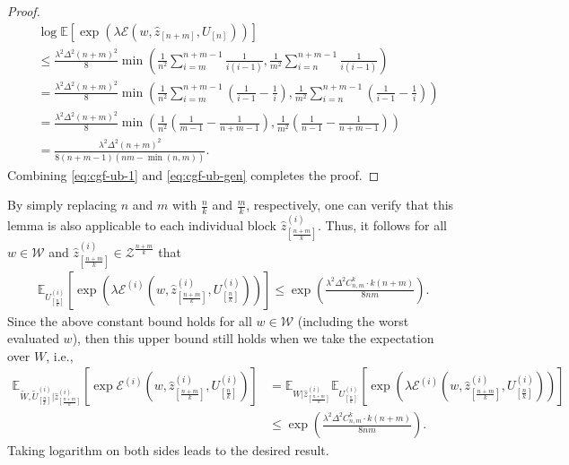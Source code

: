 \documentclass[onecolumn,romanappendices,10pt]{IEEEtran}
\newcommand{\Ecal}{{\mathcal E}}
\newcommand{\Wcal}{{\mathcal W}}
\newcommand{\Zcal}{{\mathcal Z}}
\newcommand{\EE}{{\mathbb{E}}}
\begin{document}
\begin{proof}
\begin{equation}
			\begin{aligned}
				&\log \EE \left[ \exp \left( \lambda \Ecal\left( w, \hat{z}_{[n+m]}, U_{[n]} \right) \right) \right] \\
				&\leq \frac{\lambda^2 \Delta^2 (n+m)^2}{8} \min \left( \frac{1}{n^2} \sum_{i=m}^{n+m-1} \frac{1}{i(i-1)}, \frac{1}{m^2} \sum_{i=n}^{n+m-1} \frac{1}{i(i-1)} \right) \\
				&= \frac{\lambda^2 \Delta^2 (n+m)^2}{8} \min \left( \frac{1}{n^2} \sum_{i=m}^{n+m-1} \left( \frac{1}{i-1} - \frac{1}{i} \right), \frac{1}{m^2} \sum_{i=n}^{n+m-1} \left( \frac{1}{i-1} - \frac{1}{i} \right) \right) \\
				&= \frac{\lambda^2 \Delta^2 (n+m)^2}{8} \min \left( \frac{1}{n^2} \left( \frac{1}{m-1} - \frac{1}{n+m-1} \right), \frac{1}{m^2} \left( \frac{1}{n-1} - \frac{1}{n+m-1} \right) \right) \\
				&= \frac{\lambda^2 \Delta^2 (n+m)^2}{8 (n+m-1) (nm - \min(n, m))}.
				\label{eq:cgf-ub-gen}
			\end{aligned}
		\end{equation}
		Combining \eqref{eq:cgf-ub-1} and \eqref{eq:cgf-ub-gen} completes the proof.
	\end{proof}
	
	By simply replacing $n$ and $m$ with $\frac{n}{k}$ and $\frac{m}{k}$, respectively, one can verify that this lemma is also applicable to each individual block $\hat{z}^{(i)}_{[\frac{n+m}{k}]}$. Thus, it follows for all $w \in \Wcal$ and $\hat{z}^{(i)}_{[\frac{n+m}{k}]} \in \Zcal^{\frac{n+m}{k}}$ that
	\begin{align}
		\EE_{U^{(i)}_{[\frac{n}{k}]}} \left[ \exp \left( \lambda \Ecal^{(i)}\left( w, \hat{z}^{(i)}_{[\frac{n+m}{k}]}, U^{(i)}_{[\frac{n}{k}]} \right) \right) \right] \leq \exp \left( \frac{\lambda^2 \Delta^2 C^k_{n,m} \cdot k(n+m)}{8nm} \right).
	\end{align}
	Since the above constant bound holds for all $w \in \Wcal$ (including the worst evaluated $w$), then this upper bound still holds when we take the expectation over $W$, i.e.,
	\begin{align}
		\EE_{\tilde{W}, \tilde{U}^{(i)}_{[\frac{n}{k}]} | \hat{z}^{(i)}_{[\frac{n+m}{k}]}} \left[ \exp \Ecal^{(i)}\left( w, \hat{z}^{(i)}_{[\frac{n+m}{k}]}, U^{(i)}_{[\frac{n}{k}]} \right) \right] &= \EE_{W | \hat{z}^{(i)}_{[\frac{n+m}{k}]}} \EE_{U^{(i)}_{[\frac{n}{k}]}} \left[ \exp \left( \lambda \Ecal^{(i)}\left( w, \hat{z}^{(i)}_{[\frac{n+m}{k}]}, U^{(i)}_{[\frac{n}{k}]} \right) \right) \right] \\
		&\leq \exp \left( \frac{\lambda^2 \Delta^2 C^k_{n,m} \cdot k(n+m)}{8nm} \right).
	\end{align}
	Taking logarithm on both sides leads to the desired result.
	
\end{document}
